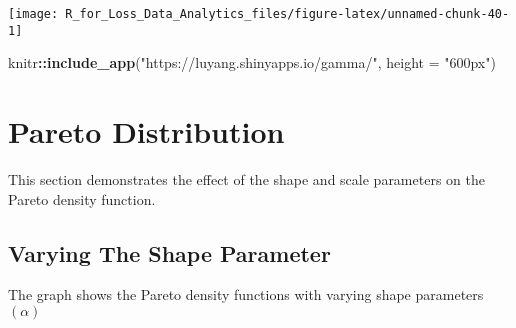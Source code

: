 \documentclass[]{book}
\newenvironment{Shaded}{\begin{snugshade}}{\end{snugshade}}
\newcommand{\KeywordTok}[1]{\textcolor[rgb]{0.13,0.29,0.53}{\textbf{#1}}}
\newcommand{\DataTypeTok}[1]{\textcolor[rgb]{0.13,0.29,0.53}{#1}}
\newcommand{\StringTok}[1]{\textcolor[rgb]{0.31,0.60,0.02}{#1}}
\newcommand{\OperatorTok}[1]{\textcolor[rgb]{0.81,0.36,0.00}{\textbf{#1}}}
\newcommand{\NormalTok}[1]{#1}
\theoremstyle{definition}
\theoremstyle{definition}
\theoremstyle{definition}
\theoremstyle{remark}
\begin{document}
\begin{center}\texttt{[image: R\_for\_Loss\_Data\_Analytics\_files/figure-latex/unnamed-chunk-40-1]} \end{center}

\begin{Shaded}
\begin{Highlighting}[]
\NormalTok{knitr}\OperatorTok{::}\KeywordTok{include_app}\NormalTok{(}\StringTok{"https://luyang.shinyapps.io/gamma/"}\NormalTok{, }
  \DataTypeTok{height =} \StringTok{"600px"}\NormalTok{)}
\end{Highlighting}
\end{Shaded}

\section{Pareto Distribution}\label{pareto-distribution}

This section demonstrates the effect of the shape and scale parameters
on the Pareto density function.

\subsection{Varying The Shape
Parameter}\label{varying-the-shape-parameter-1}

The graph shows the Pareto density functions with varying shape
parameters \((\alpha)\)
\end{document}
